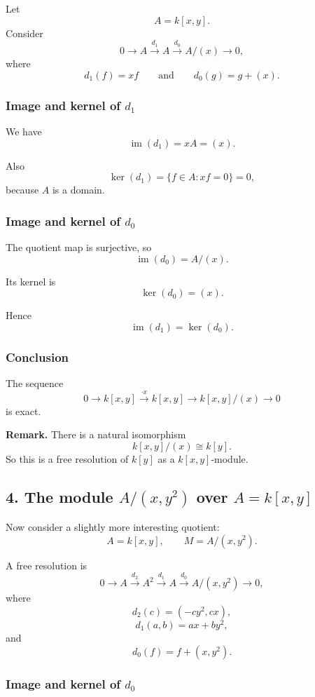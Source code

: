 \documentclass[12pt,a4paper]{article}
\theoremstyle{notespace}
\theoremstyle{definition}
\begin{document}
Let
\[
A=k[x,y].
\]
Consider
\[
0 \longrightarrow A \xrightarrow{d_1} A \xrightarrow{d_0} A/(x) \longrightarrow 0,
\]
where
\[
d_1(f)=xf
\qquad\text{and}\qquad
d_0(g)=g+(x).
\]

\subsubsection*{Image and kernel of \(d_1\)}

We have
\[
\operatorname{im}(d_1)=xA=(x).
\]

Also
\[
\ker(d_1)=\{f\in A : xf=0\}=0,
\]
because \(A\) is a domain.

\subsubsection*{Image and kernel of \(d_0\)}

The quotient map is surjective, so
\[
\operatorname{im}(d_0)=A/(x).
\]

Its kernel is
\[
\ker(d_0)=(x).
\]

Hence
\[
\operatorname{im}(d_1)=\ker(d_0).
\]

\subsubsection*{Conclusion}

The sequence
\[
0 \longrightarrow k[x,y] \xrightarrow{\cdot x} k[x,y] \longrightarrow k[x,y]/(x) \longrightarrow 0
\]
is exact.

\medskip

\textbf{Remark.}
There is a natural isomorphism
\[
k[x,y]/(x)\cong k[y].
\]
So this is a free resolution of \(k[y]\) as a \(k[x,y]\)-module.

\subsection{4. The module \(A/(x,y^2)\) over \(A=k[x,y]\)}

Now consider a slightly more interesting quotient:
\[
A=k[x,y], \qquad M=A/(x,y^2).
\]

A free resolution is
\[
0 \longrightarrow A \xrightarrow{d_2} A^2 \xrightarrow{d_1} A \xrightarrow{d_0} A/(x,y^2) \longrightarrow 0,
\]
where
\[
d_2(c)=(-cy^2,cx),
\]
\[
d_1(a,b)=ax+by^2,
\]
and
\[
d_0(f)=f+(x,y^2).
\]

\subsubsection*{Image and kernel of \(d_0\)}
\end{document}
